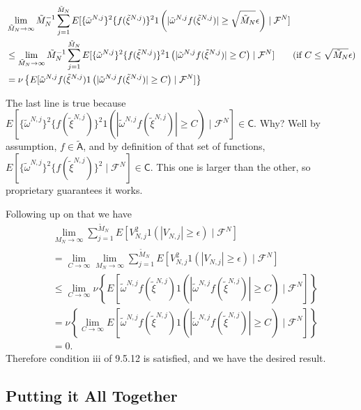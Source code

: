 \documentclass{article}
\begin{document}
\begin{align*}
& \lim_{\tilde{M}_N \to \infty} \tilde{M}_N^{-1} \sum_{j=1}^{\tilde{M}_N} E[ \{\tilde{\omega}^{N,j}\}^2 \{ f(\tilde{\xi}^{N,j})\}^2 1\left( |\tilde{\omega}^{N,j} f(\tilde{\xi}^{N,j})| \ge \sqrt{\tilde{M}_N} \epsilon \right) \mid \mathcal{F}^N]  \\
&\le \lim_{\tilde{M}_N \to \infty} \tilde{M}_N^{-1} \sum_{j=1}^{\tilde{M}_N} E[  \{\tilde{\omega}^{N,j}\}^2 \{ f(\tilde{\xi}^{N,j})\}^2 1\left( |\tilde{\omega}^{N,j} f(\tilde{\xi}^{N,j})| \ge C \right) \mid \mathcal{F}^N]  \tag{if $C \le \sqrt{\tilde{M}_N} \epsilon$} \\
&= \nu\left\{ E[ \tilde{\omega}^{N,j} f(\tilde{\xi}^{N,j}) 1\left( |\tilde{\omega}^{N,j} f(\tilde{\xi}^{N,j})| \ge C \right) \mid \mathcal{F}^N] \right\}
\end{align*}

The last line is true because $E[  \{\tilde{\omega}^{N,j}\}^2 \{ f(\tilde{\xi}^{N,j})\}^2 1\left( |\tilde{\omega}^{N,j} f(\tilde{\xi}^{N,j})| \ge C \right) \mid \mathcal{F}^N]   \in \mathsf{C}$. Why? Well by assumption, $f \in \tilde{\mathsf{A}}$, and by definition of that set of functions, $E[  \{\tilde{\omega}^{N,j}\}^2 \{ f(\tilde{\xi}^{N,j})\}^2  \mid \mathcal{F}^N]   \in \mathsf{C}$. This one is larger than the other, so proprietary guarantees it works. 


Following up on that we have 
\begin{align*}
&\lim_{M_N \to \infty} \sum_{j=1}^{\tilde{M}_N} E[V_{N,j}^2 1\left( |V_{N,j}| \ge \epsilon \right) \mid \mathcal{F}^N] \\
&= \lim_{C \to \infty} \lim_{M_N \to \infty} \sum_{j=1}^{\tilde{M}_N} E[V_{N,j}^2 1\left( |V_{N,j}| \ge \epsilon \right) \mid \mathcal{F}^N] \tag{no $C$ so limit doesn't matter}\\
&\le \lim_{C \to \infty} \nu\left\{ E[ \tilde{\omega}^{N,j} f(\tilde{\xi}^{N,j}) 1\left( |\tilde{\omega}^{N,j} f(\tilde{\xi}^{N,j})| \ge C \right) \mid \mathcal{F}^N] \right\} \tag{above work} \\
&= \nu\left\{ \lim_{C \to \infty} E[ \tilde{\omega}^{N,j} f(\tilde{\xi}^{N,j}) 1\left( |\tilde{\omega}^{N,j} f(\tilde{\xi}^{N,j})| \ge C \right) \mid \mathcal{F}^N] \right\} \tag{DCT} \\
&= 0.
\end{align*}
Therefore condition iii of 9.5.12 is satisfied, and we have the desired result.



\subsection{Putting it All Together}
\end{document}
